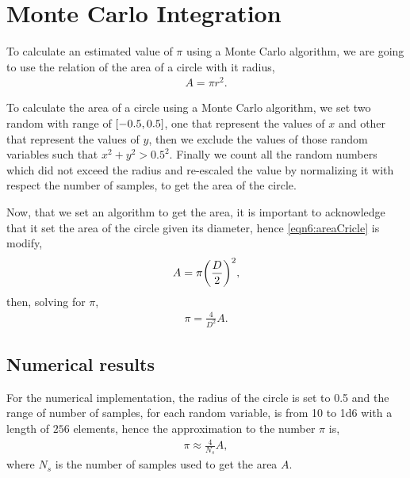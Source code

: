 \documentclass[main.tex]{subfiles}
\begin{document}

\section{Monte Carlo Integration}

To calculate an estimated value of $\pi$ using a Monte Carlo algorithm, we are going to use the relation of the area of a circle with it radius,
\begin{gather}
    A = \pi r^2.\label{eqn6:areaCricle}
\end{gather}

To calculate the area of a circle using a Monte Carlo algorithm, we set two random with range of $\qty[-0.5,0.5]$, one that represent the values of $x$ and other that represent the values of $y$, then we exclude the values of those random variables such that $x^2+y^2 > 0.5^2$. 
Finally we count all the random numbers which did not exceed the radius and re-escaled the value by normalizing it with respect the number of samples, to get the area of the circle.

Now, that we set an algorithm to get the area, it is important to acknowledge that it set the area of the circle given its diameter, hence \cref{eqn6:areaCricle} is modify,
\begin{gather*}
    A = \pi\qty(\frac{D}{2})^2,
\end{gather*}
then, solving for $\pi$,
\begin{gather}
    \pi = \frac{4}{D^2}A.
\end{gather}

\subsection{Numerical results}

For the numerical implementation, the radius of the circle is set to \num{0.5} and the range of number of samples, for each random variable, is from \num{10} to \num{1d6} with a length of $256$ elements, hence the approximation to the number $\pi$ is,
\begin{gather}
    \pi\approx \frac{4}{N_s}A,
\end{gather}
where $N_s$ is the number of samples used to get the area $A$.
\end{document}
